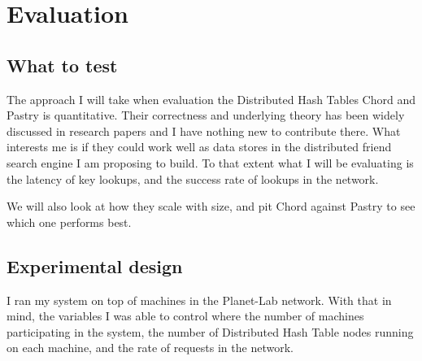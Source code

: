 

%
%
%
% 
%

\section{Evaluation}

\subsection{What to test}
The approach I will take when evaluation the Distributed Hash Tables Chord and Pastry is quantitative. Their correctness and underlying theory has been widely discussed in research papers and I have nothing new to contribute there. What interests me is if they could work well as data stores in the distributed friend search engine I am proposing to build. To that extent what I will be evaluating is the latency of key lookups, and the success rate of lookups in the network.

We will also look at how they scale with size, and pit Chord against Pastry to see which one performs best.

\subsection{Experimental design}
I ran my system on top of machines in the Planet-Lab network. With that in mind, the variables I was able to control where the number of machines participating in the system, the number of Distributed Hash Table nodes running on each machine, and the rate of requests in the network.

